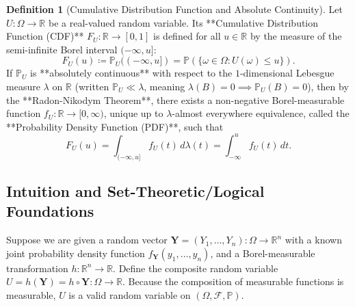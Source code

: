 \documentclass[11pt, letterpaper]{article}
\theoremstyle{definition}
\newtheorem{definition}{Definition}[section]
\theoremstyle{remark}
\newcommand{\R}{\mathbb{R}}
\newcommand{\Prob}{\mathbb{P}}
\newcommand{\F}{\mathcal{F}}
\begin{document}
\begin{definition}[Cumulative Distribution Function and Absolute Continuity]
Let $U : \Omega \to \R$ be a real-valued random variable. Its **Cumulative Distribution Function (CDF)** $F_U : \R \to [0, 1]$ is defined for all $u \in \R$ by the measure of the semi-infinite Borel interval $(-\infty, u]$:
\[
    F_U(u) \coloneqq \Prob_U((-\infty, u]) = \Prob(\{\omega \in \Omega : U(\omega) \le u\}).
\]
If $\Prob_U$ is **absolutely continuous** with respect to the $1$-dimensional Lebesgue measure $\lambda$ on $\R$ (written $\Prob_U \ll \lambda$, meaning $\lambda(B) = 0 \implies \Prob_U(B) = 0$), then by the **Radon-Nikodym Theorem**, there exists a non-negative Borel-measurable function $f_U : \R \to [0, \infty)$, unique up to $\lambda$-almost everywhere equivalence, called the **Probability Density Function (PDF)**, such that
\[
    F_U(u) = \int_{(-\infty, u]} f_U(t) \, d\lambda(t) = \int_{-\infty}^{u} f_U(t) \, dt.
\]
\end{definition}

\subsection{Intuition and Set-Theoretic/Logical Foundations}

Suppose we are given a random vector $\mathbf{Y} = (Y_1, \dots, Y_n) : \Omega \to \R^n$ with a known joint probability density function $f_{\mathbf{Y}}(y_1, \dots, y_n)$, and a Borel-measurable transformation $h : \R^n \to \R$. Define the composite random variable $U = h(\mathbf{Y}) = h \circ \mathbf{Y} : \Omega \to \R$. Because the composition of measurable functions is measurable, $U$ is a valid random variable on $(\Omega, \F, \Prob)$.
\end{document}
